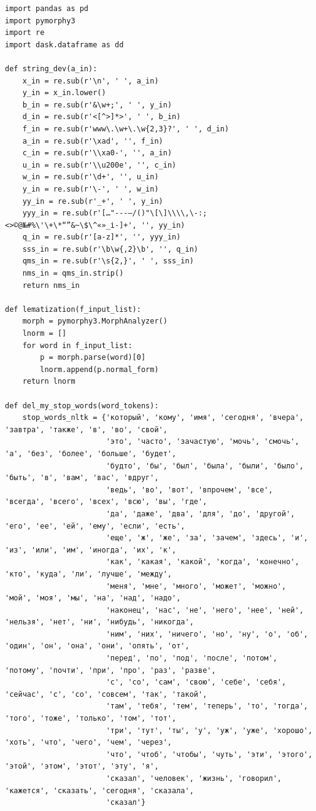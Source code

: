 \documentclass[coursework]{SCWorks}
\begin{document}
\begin{verbatim}
import pandas as pd
import pymorphy3
import re
import dask.dataframe as dd

def string_dev(a_in):
    x_in = re.sub(r'\n', ' ', a_in)
    y_in = x_in.lower()
    b_in = re.sub(r'&\w+;', ' ', y_in)
    d_in = re.sub(r'<[^>]*>', ' ', b_in)
    f_in = re.sub(r'www\.\w+\.\w{2,3}?', ' ', d_in)
    a_in = re.sub(r'\xad', '', f_in)
    c_in = re.sub(r'\\xa0-', '', a_in)
    u_in = re.sub(r'\\u200e', '', c_in)
    w_in = re.sub(r'\d+', '', u_in)
    y_in = re.sub(r'\-', ' ', w_in)
    yy_in = re.sub(r'_+', ' ', y_in)
    yyy_in = re.sub(r'[…"---–/()"\[\]\\\\,\-:;<>©@№#%\'\+\*“”&~\$\^«»_і‑]+', '', yy_in)
    q_in = re.sub(r'[a-z]*', '', yyy_in)
    sss_in = re.sub(r'\b\w{,2}\b', '', q_in)
    qms_in = re.sub(r'\s{2,}', ' ', sss_in)
    nms_in = qms_in.strip()
    return nms_in

def lematization(f_input_list):
    morph = pymorphy3.MorphAnalyzer()
    lnorm = []
    for word in f_input_list:
        p = morph.parse(word)[0]
        lnorm.append(p.normal_form)
    return lnorm

def del_my_stop_words(word_tokens):
    stop_words_nltk = {'который', 'кому', 'имя', 'сегодня', 'вчера', 'завтра', 'также', 'в', 'во', 'свой',
                       'это', 'часто', 'зачастую', 'мочь', 'смочь', 'а', 'без', 'более', 'больше', 'будет',
                       'будто', 'бы', 'был', 'была', 'были', 'было', 'быть', 'в', 'вам', 'вас', 'вдруг',
                       'ведь', 'во', 'вот', 'впрочем', 'все', 'всегда', 'всего', 'всех', 'всю', 'вы', 'где',
                       'да', 'даже', 'два', 'для', 'до', 'другой', 'его', 'ее', 'ей', 'ему', 'если', 'есть',
                       'еще', 'ж', 'же', 'за', 'зачем', 'здесь', 'и', 'из', 'или', 'им', 'иногда', 'их', 'к',
                       'как', 'какая', 'какой', 'когда', 'конечно', 'кто', 'куда', 'ли', 'лучше', 'между',
                       'меня', 'мне', 'много', 'может', 'можно', 'мой', 'моя', 'мы', 'на', 'над', 'надо',
                       'наконец', 'нас', 'не', 'него', 'нее', 'ней', 'нельзя', 'нет', 'ни', 'нибудь', 'никогда',
                       'ним', 'них', 'ничего', 'но', 'ну', 'о', 'об', 'один', 'он', 'она', 'они', 'опять', 'от',
                       'перед', 'по', 'под', 'после', 'потом', 'потому', 'почти', 'при', 'про', 'раз', 'разве',
                       'с', 'со', 'сам', 'свою', 'себе', 'себя', 'сейчас', 'c', 'со', 'совсем', 'так', 'такой',
                       'там', 'тебя', 'тем', 'теперь', 'то', 'тогда', 'того', 'тоже', 'только', 'том', 'тот',
                       'три', 'тут', 'ты', 'у', 'уж', 'уже', 'хорошо', 'хоть', 'что', 'чего', 'чем', 'через',
                       'что', 'чтоб', 'чтобы', 'чуть', 'эти', 'этого', 'этой', 'этом', 'этот', 'эту', 'я',
                       'сказал', 'человек', 'жизнь', 'говорил', 'кажется', 'сказать', 'сегодня', 'сказала',
                       'сказал'}


\end{verbatim}
\end{document}
